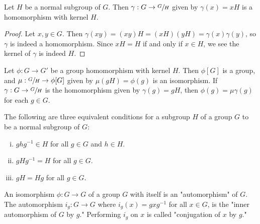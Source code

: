 \documentclass[a4paper,11pt]{article}
\begin{document}
\begin{outline}
    Let \(H\) be a normal subgroup of \(G\). Then \(\gamma: G \rightarrow \sfrac{G}{H}\) given by
    \(\gamma(x) = xH\) is a homomorphism with kernel \(H\).
    
    \begin{proof}
      Let \(x, y \in G\). Then \(\gamma(xy) = (xy)H = (xH)(yH) = \gamma(x)\gamma(y)\), so \(\gamma\) is indeed a 
      homomorphism. Since \(xH= H\) if and only if \(x \in H\), we see the kernel of \(\gamma\) is 
      indeed \(H\).
    \end{proof}
    
    Let \(\phi: G \rightarrow G'\) be a group homomorphism with kernel \(H\). Then \(\phi[G]\) is a group, 
    and \(\mu: \sfrac{G}{H} \rightarrow \phi[G]\) given by \(\mu(gH) = \phi(g)\) is an isomorphism. If 
    \(\gamma: G \rightarrow \sfrac{G}{H}\) is the homomorphism given by \(\gamma(g) = gH\), then 
    \(\phi(g) = \mu\gamma(g)\) for each \(g \in G\).
    
    The following are three equivalent conditions for a subgroup \(H\) of a group \(G\) to be a normal subgroup of \(G\):
    \begin{enumerate}[i.]
      \item \(ghg^{-1} \in H\) for all \(g \in G\) and \(h \in H\).
      \item \(gHg^{-1} = H\) for all \(g \in G\).
      \item \(gH = Hg\) for all \(g \in G\).
    \end{enumerate}
    
    An isomorphism \(\phi: G \rightarrow G\) of a group \(G\) with itself is an "automorphism" of
    \(G\). The automorphism \(i_{g}: G \rightarrow G\) where \(i_{g}(x) = gxg^{-1}\) for all \(x \in G\), is the
    "inner automorphism of \(G\) by \(g\)." Performing \(i_{g}\) on \(x\) is called "conjugation of \(x\) by \(g\)."
    
\end{outline}
\end{document}
